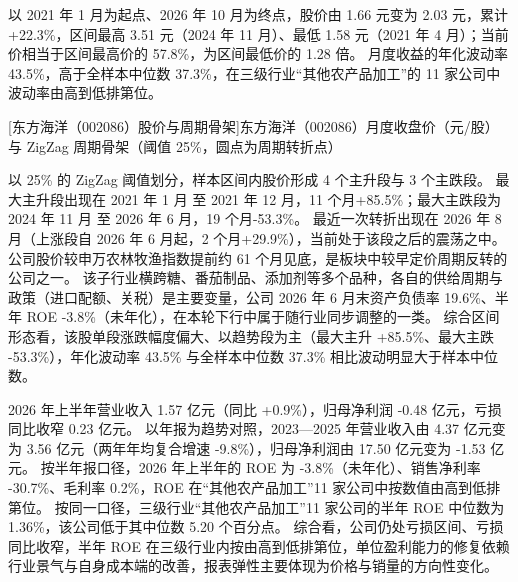  以 2021 年 1 月为起点、2026 年 10 月为终点，股价由 1.66 元变为 2.03 元，累计 +22.3\%，区间最高 3.51 元（2024 年 11 月）、最低 1.58 元（2021 年 4 月）；当前价相当于区间最高价的 57.8\%，为区间最低价的 1.28 倍。 月度收益的年化波动率 43.5\%，高于全样本中位数 37.3\%，在三级行业“其他农产品加工”的 11 家公司中波动率由高到低排第位。

\begin{center}
\begin{minipage}{\textwidth}\centering
{}

[东方海洋（002086）股价与周期骨架]{东方海洋（002086）月度收盘价（元/股）与 ZigZag 周期骨架（阈值 25\%，圆点为周期转折点）}
\end{minipage}
\end{center}

 以 25\% 的 ZigZag 阈值划分，样本区间内股价形成 4 个主升段与 3 个主跌段。 最大主升段出现在 2021 年 1 月 至 2021 年 12 月，11 个月+85.5\%；最大主跌段为 2024 年 11 月 至 2026 年 6 月，19 个月-53.3\%。 最近一次转折出现在 2026 年 8 月（上涨段自 2026 年 6 月起，2 个月+29.9\%），当前处于该段之后的震荡之中。 公司股价较申万农林牧渔指数提前约 61 个月见底，是板块中较早定价周期反转的公司之一。 该子行业横跨糖、番茄制品、添加剂等多个品种，各自的供给周期与政策（进口配额、关税）是主要变量，公司 2026 年 6 月末资产负债率 19.6\%、半年 ROE -3.8\%（未年化），在本轮下行中属于随行业同步调整的一类。 综合区间形态看，该股单段涨跌幅度偏大、以趋势段为主（最大主升 +85.5\%、最大主跌 -53.3\%），年化波动率 43.5\% 与全样本中位数 37.3\% 相比波动明显大于样本中位数。

 2026 年上半年营业收入 1.57 亿元（同比 +0.9\%），归母净利润 -0.48 亿元，亏损同比收窄 0.23 亿元。 以年报为趋势对照，2023---2025 年营业收入由 4.37 亿元变为 3.56 亿元（两年年均复合增速 -9.8\%），归母净利润由 17.50 亿元变为 -1.53 亿元。 按半年报口径，2026 年上半年的 ROE 为 -3.8\%（未年化）、销售净利率 -30.7\%、毛利率 0.2\%，ROE 在“其他农产品加工”11 家公司中按数值由高到低排第位。 按同一口径，三级行业“其他农产品加工”11 家公司的半年 ROE 中位数为 1.36\%，该公司低于其中位数 5.20 个百分点。 综合看，公司仍处亏损区间、亏损同比收窄，半年 ROE 在三级行业内按由高到低排第位，单位盈利能力的修复依赖行业景气与自身成本端的改善，报表弹性主要体现为价格与销量的方向性变化。

